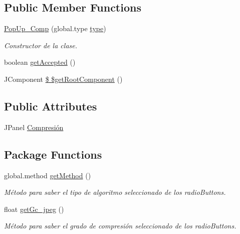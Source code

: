 \subsection*{Public Member Functions}
\begin{DoxyCompactItemize}
\item 
\hyperlink{classpresentacion_1_1form_1_1PopUp__Comp_afe8952b1a34b6ed17ad1698000ceba81}{Pop\+Up\+\_\+\+Comp} (global.\+type \hyperlink{classpresentacion_1_1form_1_1PopUp__Comp_af1981117e5555e0308d7e4a0f61db50b}{type})
\begin{DoxyCompactList}\small\item\em Constructor de la clase. \end{DoxyCompactList}\item 
boolean \hyperlink{classpresentacion_1_1form_1_1PopUp__Comp_af8adf2ad4849ea03ea61c5d681bb0a28}{get\+Accepted} ()
\item 
J\+Component \hyperlink{classpresentacion_1_1form_1_1PopUp__Comp_a8f22f1163ae09f7b29cf322670530af9}{\$ \$get\+Root\+Component} ()
\end{DoxyCompactItemize}
\subsection*{Public Attributes}
\begin{DoxyCompactItemize}
\item 
J\+Panel \hyperlink{classpresentacion_1_1form_1_1PopUp__Comp_a5769b499f21466bae765c41428512966}{Compresión}
\end{DoxyCompactItemize}
\subsection*{Package Functions}
\begin{DoxyCompactItemize}
\item 
global.\+method \hyperlink{classpresentacion_1_1form_1_1PopUp__Comp_ab63511cd207f6a9f6e4f8b52f0b66523}{get\+Method} ()
\begin{DoxyCompactList}\small\item\em Método para saber el tipo de algoritmo seleccionado de los radio\+Button\textquotesingle{}s. \end{DoxyCompactList}\item 
float \hyperlink{classpresentacion_1_1form_1_1PopUp__Comp_ae86e9a82127808eae449a150c8ce1595}{get\+Gc\+\_\+jpeg} ()
\begin{DoxyCompactList}\small\item\em Método para saber el grado de compresión seleccionado de los radio\+Button\textquotesingle{}s. \end{DoxyCompactList}\end{DoxyCompactItemize}
